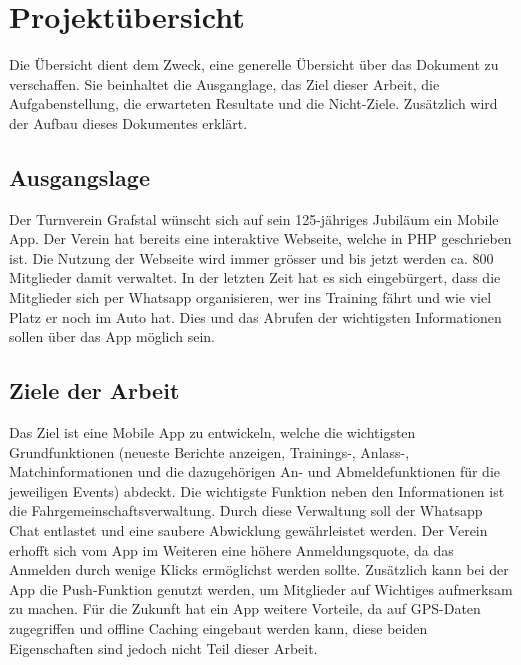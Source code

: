 %
%

\chapter{Projektübersicht}\label{chap.projektuebersicht}

Die Übersicht dient dem Zweck, eine generelle Übersicht über das Dokument zu verschaffen. Sie beinhaltet die Ausganglage, das Ziel dieser Arbeit, die Aufgabenstellung, die erwarteten Resultate und die Nicht-Ziele. Zusätzlich wird der Aufbau dieses Dokumentes erklärt.

\section{Ausgangslage}\label{ausganglage}
Der Turnverein Grafstal wünscht sich auf sein 125-jähriges Jubiläum ein Mobile App. Der Verein hat bereits eine interaktive Webseite, welche in PHP geschrieben ist. Die Nutzung der Webseite wird immer grösser und bis jetzt werden ca. 800 Mitglieder damit verwaltet. In der letzten Zeit hat es sich eingebürgert, dass die Mitglieder sich per Whatsapp organisieren, wer ins Training fährt und wie viel Platz er noch im Auto hat. Dies und das Abrufen der wichtigsten Informationen sollen über das App möglich sein.

\section{Ziele der Arbeit}\label{ziele}
Das Ziel ist eine Mobile App zu entwickeln, welche die wichtigsten Grundfunktionen (neueste Berichte anzeigen, Trainings-, Anlass-, Matchinformationen und die dazugehörigen An- und Abmeldefunktionen für die jeweiligen Events) abdeckt. Die wichtigste Funktion neben den Informationen ist die Fahrgemeinschaftsverwaltung. Durch diese Verwaltung soll der Whatsapp Chat entlastet und eine saubere Abwicklung gewährleistet werden. Der Verein erhofft sich vom App im Weiteren eine höhere Anmeldungsquote, da das Anmelden durch wenige Klicks ermöglichst werden sollte. Zusätzlich kann bei der App die Push-Funktion genutzt werden, um Mitglieder auf Wichtiges aufmerksam zu machen. Für die Zukunft hat ein App weitere Vorteile, da auf GPS-Daten zugegriffen  und offline Caching eingebaut  werden kann, diese beiden Eigenschaften sind jedoch nicht Teil dieser Arbeit.

